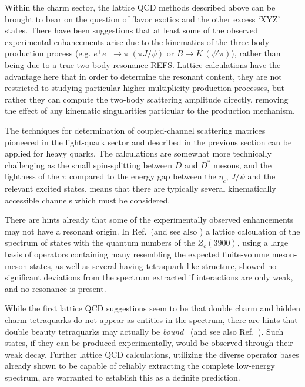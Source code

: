 
Within the charm sector, the lattice QCD methods described above can be brought to bear on the question of flavor exotics and the other excess `XYZ' states. There have been suggestions that at least some of the observed experimental enhancements arise due to the kinematics of the three-body production process (e.g. $e^+e^- \to \pi \; (\pi J/\psi) $ or $B \to K \, (\psi' \pi)$), rather than being due to a true two-body resonance {\color{red}REFS}. Lattice calculations have the advantage here that in order to determine the resonant content, they are not restricted to studying particular higher-multiplicity production processes, but rather they can compute the two-body scattering amplitude directly, removing the effect of any kinematic singularities particular to the production mechanism.

The techniques for determination of coupled-channel scattering matrices pioneered in the light-quark sector and described in the previous section can be applied for heavy quarks. The calculations are somewhat more technically challenging as the small spin-splitting between $D$ and $D^*$ mesons, and the lightness of the $\pi$ compared to the energy gap between the $\eta_c$, $J/\psi$ and the relevant excited states, means that there are typically several kinematically accessible channels which must be considered.


There are hints already that some of the experimentally observed enhancements may not have a resonant origin. In Ref.~\cite{Cheung:2017tnt}(and see also \cite{Prelovsek:2014swa}) a lattice calculation of the spectrum of states with the quantum numbers of the $Z_c(3900)$, using a large basis of operators containing many resembling the expected finite-volume meson-meson states, as well as several having tetraquark-like structure, showed no significant deviations from the spectrum extracted if interactions are only weak, and no resonance is present. 

While the first lattice QCD suggestions seem to be that double charm and hidden charm tetraquarks do not appear as entities in the spectrum, there are hints that double beauty tetraquarks may actually be \emph{bound}~\cite{Francis:2016hui} (and see also Ref.~\cite{Hughes:2017xie}). Such states, if they can be produced experimentally, would be observed through their weak decay. Further lattice QCD calculations, utilizing the diverse operator bases already shown to be capable of  reliably extracting the complete low-energy spectrum, are warranted to establish this as a definite prediction. 


